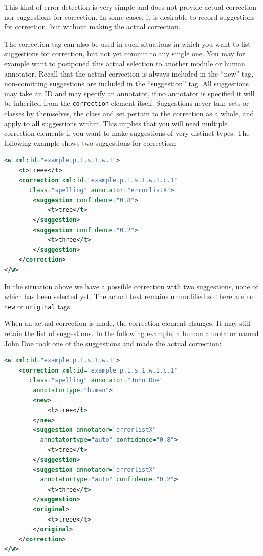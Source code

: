\documentclass[a4paper,12pt]{report}
\begin{document}
This kind of error detection is very simple and does not provide actual correction nor suggestions for correction. In some cases, it is desirable to record suggestions for correction, but without making the actual correction.

The correction tag can also be used in such situations in which you want to list suggestions for correction, but not yet commit to any single one. You may for example want to postponed this actual selection to another module or human annotator. Recall that the actual correction is always included in the ``new'' tag, non-comitting suggestions are included in the ``suggestion'' tag. All suggestions may take an ID and may specify an annotator, if no annotator is specified it will be inherited from the \texttt{correction} element itself. Suggestions never take sets or classes by themselves, the class and set pertain to the correction as a whole, and apply to all suggestions within. This implies that you will need multiple correction elements if you want to make suggestions of very distinct types. The following example shows two suggestions for correction:
 
\begin{lstlisting}[language=xml]
<w xml:id="example.p.1.s.1.w.1">
    <t>treee</t>
    <correction xml:id="example.p.1.s.1.w.1.c.1"
       class="spelling" annotator="errorlistX">
        <suggestion confidence="0.8">
            <t>tree</t>
        </suggestion>
        <suggestion confidence="0.2">
            <t>three</t>
        </suggestion>
    </correction>
</w>    
\end{lstlisting}

In the situation above we have a possible correction with two suggestions, none of which has been selected yet. The actual text remains unmodified so there are no \texttt{new} or \texttt{original} tags.

When an actual correction is made, the correction element changes. It may still retain the list of suggestions. In the following example, a human annotator named John Doe took one of the suggestions and made the actual correction:

\begin{lstlisting}[language=xml]
<w xml:id="example.p.1.s.1.w.1">
    <correction xml:id="example.p.1.s.1.w.1.c.1"
       class="spelling" annotator="John Doe"
        annotatortype="human">
        <new>
            <t>tree</t>
        </new>
        <suggestion annotator="errorlistX" 
          annotatortype="auto" confidence="0.8">
            <t>tree</t>
        </suggestion>
        <suggestion annotator="errorlistX" 
          annotatortype="auto" confidence="0.2">
            <t>three</t>
        </suggestion>
        <original>
            <t>treee</t>
        </original>
    </correction>
</w>    
\end{lstlisting}
\end{document}
